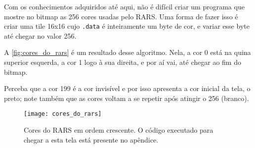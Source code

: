 \documentclass[10pt, a4paper, twoside]{article}
\begin{document}
        Com os conhecimentos adquiridos até aqui, não é difícil criar um programa que mostre no bitmap as 256 cores usadas pelo RARS.
        Uma forma de fazer isso é criar uma tile 16x16 cujo {\tt .data} é inteiramente um byte de cor, e variar esse byte até chegar no valor 256.
        
        \medskip
        
        A \autoref{fig:cores_do_rars} é um resultado desse algoritmo.
        Nela, a cor 0 está na quina superior esquerda, a cor 1 logo à sua direita, e por aí vai, até chegar ao fim do bitmap.
        
        \medskip
        
        Perceba que a cor 199 é a cor invisível e por isso apresenta a cor inicial da tela, o preto;
        note também que as cores voltam a se repetir após atingir o 256 (branco).
        \begin{figure}[H]\centering
            \caption{
                Cores do RARS em ordem crescente. 
                O código executado para chegar a esta tela está presente no apêndice.}
            \texttt{[image: cores\_do\_rars]}
            \label{fig:cores_do_rars}
        \end{figure}
    
    
\end{document}
